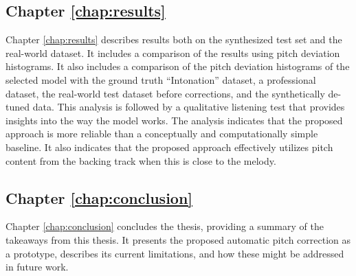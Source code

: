\subsection{Chapter \ref{chap:results}}
Chapter \ref{chap:results} describes results both on the synthesized test set and the real-world dataset. It includes a comparison of the results using pitch deviation histograms. It also includes a comparison of the pitch deviation histograms of the selected model with the ground truth ``Intonation'' dataset, a professional dataset, the real-world test dataset before corrections, and the synthetically de-tuned data. This analysis is followed by a qualitative listening test that provides insights into the way the model works. The analysis indicates that the proposed approach is more reliable than a conceptually and computationally simple baseline. It also indicates that the proposed approach effectively utilizes pitch content from the backing track when this is close to the melody.

\subsection{Chapter \ref{chap:conclusion}}
Chapter \ref{chap:conclusion} concludes the thesis, providing a summary of the takeaways from this thesis. It presents the proposed automatic pitch correction as a prototype, describes its current limitations, and how these might be addressed in future work.




